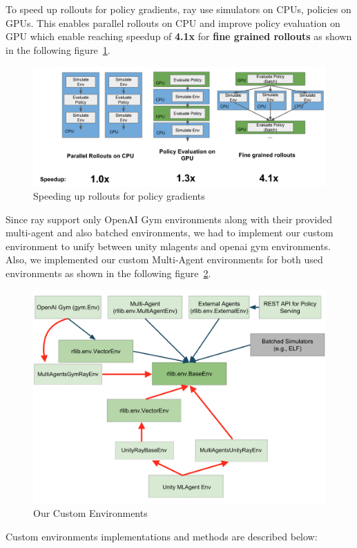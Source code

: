 To speed up rollouts for policy gradients, ray use simulators on CPUs, policies on GPUs. This enables parallel rollouts on CPU and improve policy evaluation on GPU which enable reaching speedup of \textbf{4.1x} for \textbf{fine grained rollouts} as shown in the following figure~\ref{fig:ray_speedup}.
\begin{figure}[!htb]
	\centering
	\includegraphics[width=\textwidth]{figures/architecture/ray_speedup.png}
	\caption{Speeding up rollouts for policy gradients}
	\label{fig:ray_speedup}
\end{figure}


Since ray support only OpenAI Gym environments along with their provided multi-agent and also batched environments, we had to implement our custom environment to unify between unity mlagents and openai gym environments. Also, we implemented our custom Multi-Agent environments for both used environments as shown in the following figure~\ref{fig:ray_envs}.

\begin{figure}[!htb]
	\centering
	\includegraphics[width=0.7\linewidth]{figures/architecture/ray_envs.png}
	\caption{Our Custom Environments}
	\label{fig:ray_envs}
\end{figure}


Custom environments implementations and methods are described below:


